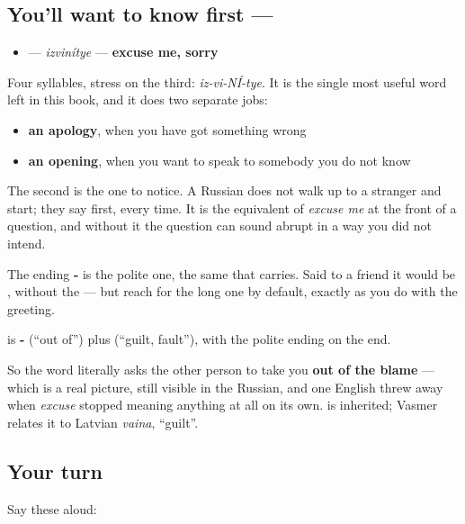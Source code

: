 \subsection*{You'll want to know first — }
\begin{itemize}
\raggedright
  \item \textbf{} — \emph{izvinítye} — \textbf{excuse me, sorry}
\end{itemize}

Four syllables, stress on the third: \emph{iz-vi-NÍ-tye}. It is the single most useful word left in this book, and it does two separate jobs:

\begin{itemize}
\raggedright
  \item \textbf{an apology}, when you have got something wrong
  \item \textbf{an opening}, when you want to speak to somebody you do not know
\end{itemize}

The second is the one to notice. A Russian does not walk up to a stranger and start; they say \textbf{} first, every time. It is the equivalent of \emph{excuse me} at the front of a question, and without it the question can sound abrupt in a way you did not intend.

The ending \textbf{-} is the polite one, the same \textbf{} that \textbf{} carries. Said to a friend it would be \textbf{}, without the \textbf{} — but reach for the long one by default, exactly as you do with the greeting.

\begin{cousinweb}
\textbf{} is \textbf{-} (\textquotedblleft{}out of\textquotedblright{}) plus \textbf{} (\textquotedblleft{}guilt, fault\textquotedblright{}), with the polite ending on the end.

So the word literally asks the other person to take you \textbf{out of the blame} — which is a real picture, still visible in the Russian, and one English threw away when \emph{excuse} stopped meaning anything at all on its own. \textbf{} is inherited; Vasmer relates it to Latvian \emph{vaina}, \textquotedblleft{}guilt\textquotedblright{}.
\end{cousinweb}

\subsection*{Your turn}
Say these aloud:

